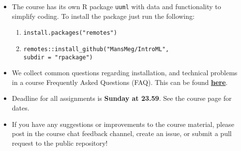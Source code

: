 \begin{itemize}
\item The course has its own R package \texttt{uuml} with data and functionality to simplify coding. To install the package just run the following:
\begin{enumerate}
\item \texttt{install.packages("remotes")}
\item \texttt{remotes::install\_github("MansMeg/IntroML", \\ subdir = "rpackage")}
\end{enumerate}


\item We collect common questions regarding installation, and technical problems in a course Frequently Asked Questions (FAQ). This can be found \href{https://github.com/MansMeg/IntroML/blob/master/FAQ.md}{\textbf{here}}.

\item Deadline for all assignments is \textbf{Sunday at 23.59}. See the course page for dates.

\item If you have any suggestions or improvements to the course material, please post in the course chat feedback channel, create an issue, or submit a pull request to the public repository!

\end{itemize}

